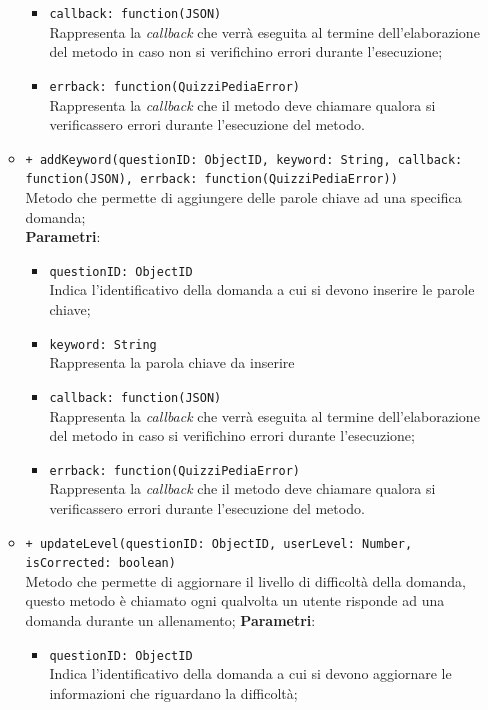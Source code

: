 \begin{itemize}
\begin{itemize}
\begin{itemize}
			\item \texttt{callback: function(JSON)} \\
			Rappresenta la \textit{callback} che verrà eseguita al termine dell'elaborazione del metodo in caso non si verifichino errori durante l'esecuzione;
			\item \texttt{errback: function(QuizziPediaError)} \\
			Rappresenta la \textit{callback} che il metodo deve chiamare qualora si verificassero errori durante l'esecuzione del metodo.
		\end{itemize}
	\item \texttt{+ addKeyword(questionID: ObjectID, keyword: String, callback: function(JSON), errback: function(QuizziPediaError))} \\
	Metodo che permette di aggiungere delle parole chiave ad una specifica domanda; \\
		\textbf{Parametri}:
			 \begin{itemize}
			 	\item \texttt{questionID: ObjectID} \\
			 	Indica l'identificativo della domanda a cui si devono inserire le parole chiave;
			 	\item \texttt{keyword: String} \\
			 	Rappresenta la parola chiave da inserire
			 	\item \texttt{callback: function(JSON)} \\
			 	Rappresenta la \textit{callback} che verrà eseguita al termine dell'elaborazione del metodo in caso si verifichino errori durante l'esecuzione;
			 	\item \texttt{errback: function(QuizziPediaError)} \\
			 	Rappresenta la \textit{callback} che il metodo deve chiamare qualora si verificassero errori durante l'esecuzione del metodo.
			 \end{itemize}
	\item \texttt{+ updateLevel(questionID: ObjectID, userLevel: Number, isCorrected: boolean)} \\
	Metodo che permette di aggiornare il livello di difficoltà della domanda, questo metodo è chiamato ogni qualvolta un utente risponde ad una domanda durante un allenamento;
		\textbf{Parametri}:
			\begin{itemize}
				\item \texttt{questionID: ObjectID} \\
				Indica l'identificativo della domanda a cui si devono aggiornare le informazioni che riguardano la difficoltà;

\end{itemize}
\end{itemize}
\end{itemize}

